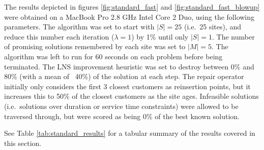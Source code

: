 The results depicted in figures \ref{fig:standard_fast} and \ref{fig:standard_fast_blowup} were obtained on a MacBook Pro 2.8 GHz Intel Core 2 Duo, using the following parameters. The algorithm was set to start with $|S| = 25$ (i.e.~25 sites), and reduce this number each iteration ($\lambda = 1$) by 1\% until only $|S| = 1$. The number of promising solutions remembered by each site was set to $|M| = 5$. The algorithm was left to run for 60 seconds on each problem before being terminated. The LNS improvement heuristic was set to destroy between 0\% and 80\% (with a mean of ~40\%) of the solution at each step. The repair operator initially only considers the first 3 closest customers as reinsertion points, but it increases this to 50\% of the closest customers as the site ages. Infeasible solutions (i.e.~solutions over duration or service time constraints) were allowed to be traversed through, but were scored as being 0\% of the best known solution.

See Table \ref{tab:standard_results} for a tabular summary of the results covered in this section.

